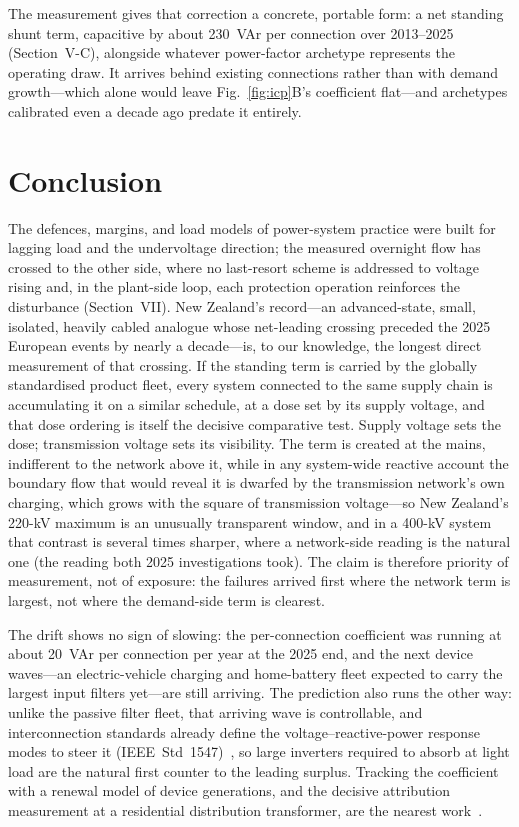 \documentclass[journal]{IEEEtran}
\begin{document}
The measurement gives that correction a concrete, portable form: a net standing shunt term, capacitive by about 230~VAr per connection over 2013--2025 (Section~V-C), alongside whatever power-factor archetype represents the operating draw. It arrives behind existing connections rather than with demand growth---which alone would leave Fig.~\ref{fig:icp}B's coefficient flat---and archetypes calibrated even a decade ago predate it entirely.

\section{Conclusion}
The defences, margins, and load models of power-system practice were built for
lagging load and the undervoltage direction; the measured overnight flow has
crossed to the other side, where no last-resort scheme is addressed to voltage
rising and, in the plant-side loop, each protection operation reinforces the
disturbance (Section~VII).
New Zealand's record---an advanced-state, small, isolated, heavily cabled
analogue whose net-leading crossing preceded the 2025 European events by nearly a
decade---is, to our knowledge, the longest direct measurement of that crossing.
If the standing term is carried by the globally standardised product fleet, every
system connected to the same supply chain is accumulating it on a similar
schedule, at a dose set by its supply voltage, and that dose ordering is itself the decisive comparative test. Supply voltage sets the dose; transmission voltage sets its
visibility. The term is created at the mains, indifferent to the network above
it, while in any system-wide reactive account the boundary flow that would reveal it is dwarfed by the transmission network's own charging, which grows with the square of transmission voltage---so New Zealand's 220-kV maximum is an unusually transparent window, and in a 400-kV system that contrast is several times sharper, where a network-side reading is the natural one (the reading both 2025 investigations took). The claim
is therefore priority of measurement, not of exposure: the failures arrived first
where the network term is largest, not where the demand-side term is clearest.

The drift shows no sign of slowing: the per-connection coefficient was running at
about 20~VAr per connection per year at the 2025 end, and the next device
waves---an electric-vehicle charging and home-battery fleet expected to carry the
largest input filters yet---are still arriving. The prediction also runs the
other way: unlike the passive filter fleet, that arriving wave is controllable,
and interconnection standards already define the voltage--reactive-power response
modes to steer it (IEEE~Std~1547)~\cite{ieee1547}, so large inverters required to absorb at light
load are the natural first counter to the leading surplus. Tracking the
coefficient with a renewal model of device generations, and the decisive
attribution measurement at a residential distribution transformer, are the nearest work~\cite{hume_extended}.
\end{document}
